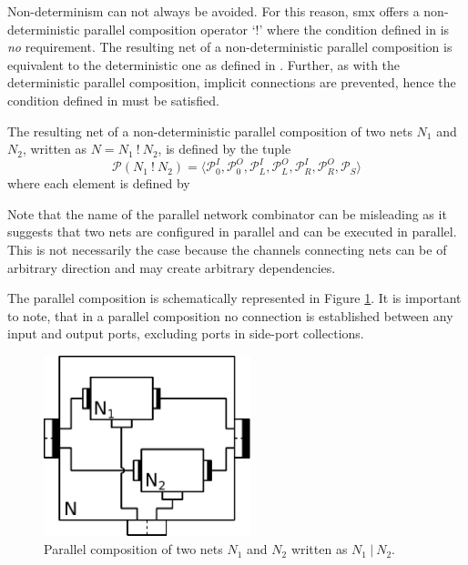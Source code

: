 Non-determinism can not always be avoided.
For this reason, \gls*{smx} offers a non-deterministic parallel composition operator `$!$' where the condition defined in \Equ{\ref{eq_smx_p_non_det}} is \emph{no} requirement.
The resulting net of a non-deterministic parallel composition is equivalent to the deterministic one as defined in \Def{\ref{def_smx_pnd}}.
Further, as with the deterministic parallel composition, implicit connections are prevented, hence the condition defined in \Equ{\ref{eq_smx_p_no_con}} must be satisfied.
\begin{definition}
    \label{def_smx_pnd}
    The resulting net of a non-deterministic parallel composition of two nets $N_1$ and $N_2$, written as $N = N_1\ !\ N_2$, is defined by the tuple
    $$\mathcal{P}(N_1\ !\ N_2) = \langle \mathcal{P}_0^I, \mathcal{P}_0^O, \mathcal{P}_L^I, \mathcal{P}_L^O, \mathcal{P}_R^I, \mathcal{P}_R^O, \mathcal{P}_S \rangle$$
    where each element is defined by \Def{\ref{def_smx_pd}}
\end{definition}

Note that the name of the parallel network combinator can be misleading as it suggests that two nets are configured in parallel and can be executed in parallel.
This is not necessarily the case because the channels connecting nets can be of arbitrary direction and may create arbitrary dependencies.

The parallel composition is schematically represented in Figure \ref{fig_parallel}.
It is important to note, that in a parallel composition no connection is established between any input and output ports, excluding ports in side-port collections.
\begin{figure}[bht]\begin{center}
\TopFigSpace
    \centering
\includegraphics[width=6cm]{fig/parallel.pdf}
    \CaptionFigSpace
    \caption{Parallel composition of two nets $N_1$ and $N_2$ written as $N_1 \ | \ N_2$.}
    \label{fig_parallel}
\BotFigSpace
\end{center}\end{figure}

